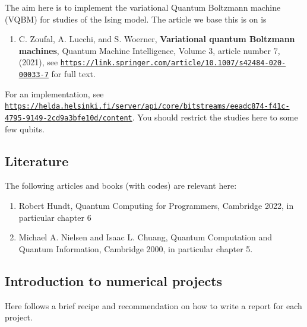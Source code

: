 \documentclass[%
oneside,                 %
final,                   %
10pt]{article}
\begin{document}
The aim here is to implement the variational Quantum Boltzmann machine (VQBM) for studies of the Ising model.
The article we base this is on is
\begin{enumerate}
\item C. Zoufal, A. Lucchi, and S. Woerner, \textbf{Variational quantum Boltzmann machines}, Quantum Machine Intelligence, Volume 3, article number 7, (2021), see \href{{https://link.springer.com/article/10.1007/s42484-020-00033-7}}{\nolinkurl{https://link.springer.com/article/10.1007/s42484-020-00033-7}} for full text.
\end{enumerate}

\noindent
For an implementation, see \href{{https://helda.helsinki.fi/server/api/core/bitstreams/eeadc874-f41c-4795-9149-2cd9a3bfe10d/content}}{\nolinkurl{https://helda.helsinki.fi/server/api/core/bitstreams/eeadc874-f41c-4795-9149-2cd9a3bfe10d/content}}. You should restrict the studies here to some few qubits.  

\subsection{Literature}

The following articles and books (with codes) are relevant here:
\begin{enumerate}
\item Robert Hundt, Quantum Computing for Programmers, Cambridge 2022, in particular chapter 6

\item Michael A. Nielsen and Isaac L. Chuang, Quantum Computation and Quantum Information, Cambridge 2000, in particular chapter 5.
\end{enumerate}

\noindent
\subsection{Introduction to numerical projects}

Here follows a brief recipe and recommendation on how to write a report for each
project.
\end{document}
